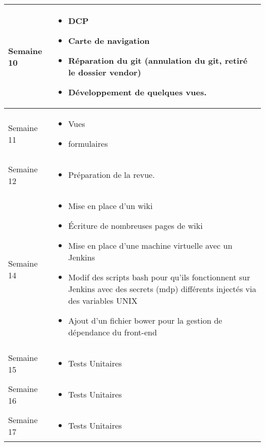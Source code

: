 \documentclass [a4paper] {article}
\begin{document}
\begin{longtable}{|>{\columncolor{gray!40}}p{2cm}|p{12cm}|}
	Semaine 10 & \begin{itemize}
		\item DCP
		\item Carte de navigation
		\item Réparation du git (annulation du git, retiré le dossier vendor)
		\item Développement de quelques vues.	
	\end{itemize} \\
	\hline
	
	Semaine 11 & \begin{itemize}
		\item Vues
		\item formulaires
	\end{itemize} \\
	\hline
	Semaine 12 & \begin{itemize}
	\item Préparation de la revue.
	\end{itemize} \\
	\hline
	
	
	Semaine 14 & \begin{itemize}
	\item Mise en place d'un wiki
	\item Écriture de nombreuses pages de wiki
	\item Mise en place d'une machine virtuelle avec un Jenkins
	\item Modif des scripts bash pour qu'ils fonctionnent sur Jenkins avec des secrets (mdp) différents injectés via des variables UNIX
	\item Ajout d'un fichier bower pour la gestion de dépendance du front-end
	\end{itemize} \\
	\hline
	
	Semaine 15 & \begin{itemize}
	\item Tests Unitaires
	\end{itemize} \\
	\hline

	Semaine 16 & \begin{itemize}
	\item Tests Unitaires
	\end{itemize} \\
	\hline
	
	Semaine 17 & \begin{itemize}
	\item Tests Unitaires
	\end{itemize} \\
	\hline	
	

\end{longtable}
\end{document}
